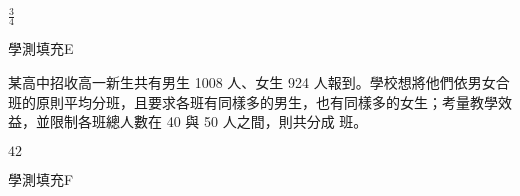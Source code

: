 \begin{QUESTIONS}
\begin{QUESTION}
        \begin{QFROMS}
        \end{QFROMS}
        \begin{QTAGS}\end{QTAGS}
        \begin{QANS}
            $\frac{3}{4}$
        \end{QANS}
        \begin{QSOLLIST}
        \end{QSOLLIST}
        \begin{QEMPTYSPACE}
        \end{QEMPTYSPACE}
    \end{QUESTION}
    \begin{QUESTION}
        \begin{ExamInfo}{93}{學測}{填充}{E}
        \end{ExamInfo}
        \begin{ExamAnsRateInfo}{52}{77}{56}{23}
        \end{ExamAnsRateInfo}
        \begin{QBODY}
            某高中招收高一新生共有男生 1008 人、女生 924 人報到。學校想將他們依男女合班的原則平均分班，且要求各班有同樣多的男生，也有同樣多的女生；考量教學效益，並限制各班總人數在 40 與 50 人之間，則共分成	
            \TCNBOX{\TCN\TCN} 班。
        \end{QBODY}
        \begin{QFROMS}
        \end{QFROMS}
        \begin{QTAGS}\end{QTAGS}
        \begin{QANS}
            $42$
        \end{QANS}
        \begin{QSOLLIST}
        \end{QSOLLIST}
        \begin{QEMPTYSPACE}
        \end{QEMPTYSPACE}
    \end{QUESTION}
    \begin{QUESTION}
        \begin{ExamInfo}{93}{學測}{填充}{F}
        \end{ExamInfo}
        \begin{ExamAnsRateInfo}{26}{61}{15}{2}
        \end{ExamAnsRateInfo}
        \begin{QBODY}

\end{QBODY}
\end{QUESTION}
\end{QUESTIONS}
